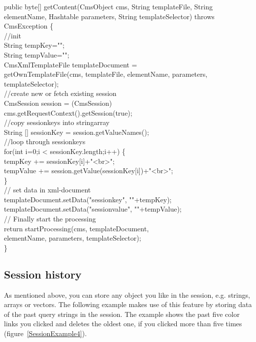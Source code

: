 \begin{java}
public byte[] getContent(CmsObject cms, String templateFile,
String elementName, Hashtable parameters, String templateSelector)
throws CmsException \{\\
\jtabc        //init\\
\jtabc        String tempKey="";\\
\jtabc        String tempValue="";\\
CmsXmlTemplateFile templateDocument =\\
getOwnTemplateFile(cms, templateFile, elementName, parameters,\\
templateSelector);\\
\jtabc        //create new or fetch existing session\\
CmsSession session = (CmsSession)\\
cms.getRequestContext().getSession(true);\\
\jtabc        //copy sessionkeys into stringarray\\
String [] sessionKey = session.getValueNames();\\
\jtabc        //loop through sessionkeys\\
\jtabc        for(int i=0;i < sessionKey.length;i++) \{\\
\jtabd                tempKey += sessionKey[i]+"<br>";\\
tempValue += session.getValue(sessionKey[i])+"<br>";\\
\}\\
\jtabc        // set data in xml-document\\
\jtabc        templateDocument.setData("sessionkey", ""+tempKey);\\
templateDocument.setData("sessionvalue", ""+tempValue);\\
\jtabd                // Finally start the processing\\
\jtabc        return startProcessing(cms, templateDocument,\\
elementName, parameters, templateSelector);\\
\}\\
\end{java}

\subsection {Session history}

As mentioned above, you can store any object you like in the session,
e.g. strings, arrays or vectors. The following example makes use of this
feature by storing data of the past query strings in the session. The
example shows the past five color links you clicked and deletes the
oldest one, if you clicked more than five times (figure~\ref{SessionExample4}).

